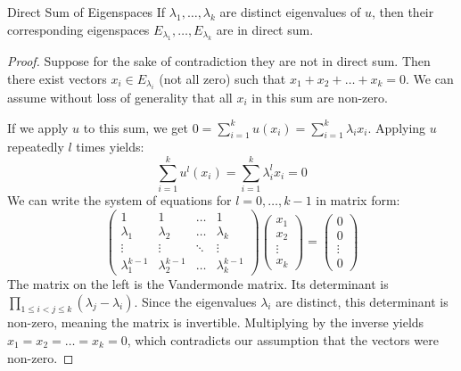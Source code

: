 \documentclass[11pt, a4paper]{article}
\begin{document}
\begin{theorem}{Direct Sum of Eigenspaces}{}
If $\lambda_1, \dots, \lambda_k$ are distinct eigenvalues of $u$, then their corresponding eigenspaces $E_{\lambda_1}, \dots, E_{\lambda_k}$ are in direct sum. 
\end{theorem}
\begin{proof}
Suppose for the sake of contradiction they are not in direct sum. 
Then there exist vectors $x_i \in E_{\lambda_i}$ (not all zero) such that $x_1 + x_2 + \dots + x_k = 0$. 
We can assume without loss of generality that all $x_i$ in this sum are non-zero. 

If we apply $u$ to this sum, we get $0 = \sum_{i=1}^k u(x_i) = \sum_{i=1}^k \lambda_i x_i$. 
Applying $u$ repeatedly $l$ times yields:
$$ \sum_{i=1}^k u^l(x_i) = \sum_{i=1}^k \lambda_i^l x_i = 0 $$ 
We can write the system of equations for $l = 0, \dots, k-1$ in matrix form:
$$ \begin{pmatrix} 
1 & 1 & \dots & 1 \\ 
\lambda_1 & \lambda_2 & \dots & \lambda_k \\ 
\vdots & \vdots & \ddots & \vdots \\ 
\lambda_1^{k-1} & \lambda_2^{k-1} & \dots & \lambda_k^{k-1} 
\end{pmatrix} 
\begin{pmatrix} x_1 \\ x_2 \\ \vdots \\ x_k \end{pmatrix} = 
\begin{pmatrix} 0 \\ 0 \\ \vdots \\ 0 \end{pmatrix} $$ 
The matrix on the left is the Vandermonde matrix. Its determinant is $\prod_{1 \le i < j \le k} (\lambda_j - \lambda_i)$. 
Since the eigenvalues $\lambda_i$ are distinct, this determinant is non-zero, meaning the matrix is invertible. 
Multiplying by the inverse yields $x_1 = x_2 = \dots = x_k = 0$, which contradicts our assumption that the vectors were non-zero. 
\end{proof}
\end{document}
